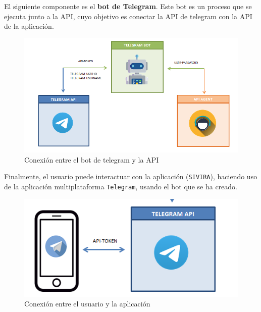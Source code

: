 El siguiente componente es el \textbf{bot de Telegram}. Este bot es un proceso que se ejecuta junto a la API, cuyo objetivo es conectar la API de telegram con la API de la aplicación.

\begin{figure}[h]
	\centering
	\includegraphics[scale=0.35]{images/34}
	\caption{Conexión entre el bot de telegram y la API}
	\label{img:conexionbotapitelegram}
\end{figure}

Finalmente, el usuario puede interactuar con la aplicación (\texttt{SIVIRA}), haciendo uso de la aplicación multiplataforma \texttt{Telegram}, usando el bot que se ha creado.

\begin{figure}[h]
	\centering
	\includegraphics[scale=0.35]{images/33}
	\caption{Conexión entre el usuario y la aplicación}
	\label{img:usuariotelegram}
\end{figure}

\newpage
